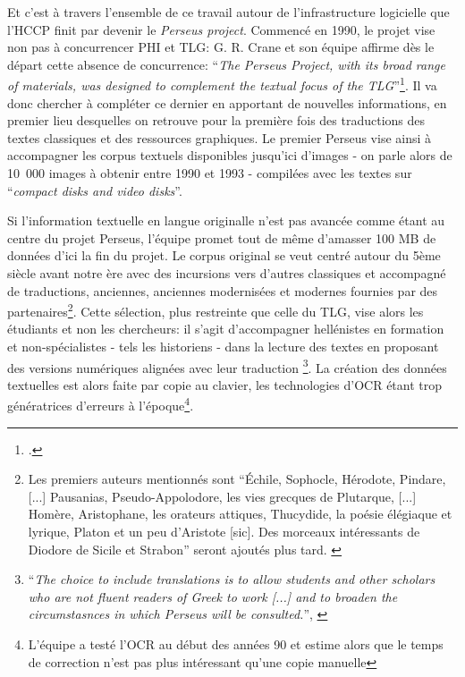 Et c'est à travers l'ensemble de ce travail autour de l'infrastructure logicielle que l'HCCP finit par devenir le \textit{Perseus project}. Commencé en 1990, le projet vise non pas à concurrencer PHI et TLG: G. R. Crane et son équipe affirme dès le départ cette absence de concurrence: \enquote{\textit{The Perseus Project, with its broad range of materials, was designed to complement the textual focus of the TLG}}\footcite[p. 134]{mylonas_perseus_1993}. Il va donc chercher à compléter ce dernier en apportant de nouvelles informations, en premier lieu desquelles on retrouve pour la première fois des traductions des textes classiques et des ressources graphiques. Le premier Perseus vise ainsi à accompagner les corpus textuels disponibles jusqu'ici d'images - on parle alors de 10~000 images à obtenir entre 1990 et 1993 - compilées avec les textes sur \enquote{\textit{compact disks and video disks}}.

Si l'information textuelle en langue originalle n'est pas avancée comme étant au centre du projet Perseus, l'équipe promet tout de même d'amasser 100 MB de données d'ici la fin du projet. Le corpus original se veut centré autour du 5ème siècle avant notre ère avec des incursions vers d'autres classiques et accompagné de traductions, anciennes, anciennes modernisées et modernes fournies par des partenaires\footnote{Les premiers auteurs mentionnés sont \enquote{Échile, Sophocle, Hérodote, Pindare, {[...]} Pausanias, Pseudo-Appolodore, les vies grecques de Plutarque, {[...]} Homère, Aristophane, les orateurs attiques, Thucydide, la poésie élégiaque et lyrique, Platon et un peu d'Aristote {[sic]}. Des morceaux intéressants de Diodore de Sicile et Strabon} seront ajoutés plus tard. \cite{mylonas_perseus_1993}}. Cette sélection, plus restreinte que celle du TLG, vise alors les étudiants et non les chercheurs: il s'agit d'accompagner hellénistes en formation et non-spécialistes - tels les historiens - dans la lecture des textes en proposant des versions numériques alignées avec leur traduction \footnote{\enquote{\textit{The choice to include translations is to allow students and other scholars who are not fluent readers of Greek to work {[...]} and to broaden the circumstasnces in which Perseus will be consulted.}}, \cite[p. 136]{mylonas_perseus_1993}}. La création des données textuelles est alors faite par copie au clavier, les technologies d'OCR étant trop génératrices d'erreurs à l'époque\footnote{L'équipe a testé l'OCR au début des années 90 et estime alors que le temps de correction n'est pas plus intéressant qu'une copie manuelle}.

